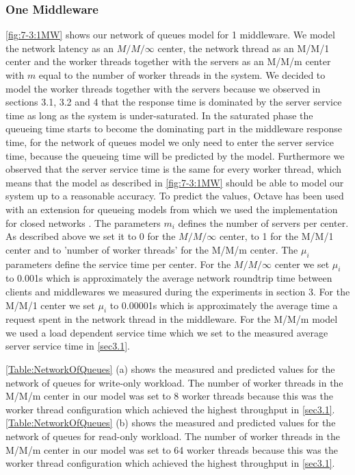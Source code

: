 \documentclass[11pt,a4paper]{article}
\begin{document}
\subsubsection{One Middleware}
\autoref{fig:7-3:1MW} shows our network of queues model for 1 middleware. We model the network latency as an $M/M/\infty$ center, the network thread as an M/M/1 center and the worker threads together with the servers as an M/M/m center with $m$ equal to the number of worker threads in the system. We decided to model the worker threads together with the servers because we observed in sections 3.1, 3.2 and 4 that the response time is dominated by the server service time as long as the system is under-saturated. In the saturated phase the queueing time starts to become the dominating part in the middleware response time, for the network of queues model we only need to enter the server service time, because the queueing time will be predicted by the model. Furthermore we observed that the server service time is the same for every worker thread, which means that the model as described in \autoref{fig:7-3:1MW} should be able to model our system up to a reasonable accuracy. To predict the values, Octave \cite{octave} has been used with an extension for queueing models from which we used the implementation for closed networks \cite[ch. 5.2.2]{queueingLib}. The parameters $m_i$ defines the number of servers per center. As described above we set it to 0 for the $M/M/\infty$ center, to 1 for the M/M/1 center and to 'number of worker threads' for the M/M/m center.
The $\mu_i$ parameters define the service time per center. For the $M/M/\infty$ center we set $\mu_i$ to 0.001s which is approximately the average network roundtrip time between clients and middlewares we measured during the experiments in section 3. For the M/M/1 center we set $\mu_i$ to 0.00001s which is approximately the average time a request spent in the network thread in the middleware.
For the M/M/m model we used a load dependent service time which we set to the measured average server service time in \autoref{sec3.1}.

\autoref{Table:NetworkOfQueues} (a) shows the measured and predicted values for the network of queues for write-only workload. The number of worker threads in the M/M/m center in our model was set to 8 worker threads because this was the worker thread configuration which achieved the highest throughput in \autoref{sec3.1}. 
\autoref{Table:NetworkOfQueues} (b) shows the measured and predicted values for the network of queues for read-only workload. The number of worker threads in the M/M/m center in our model was set to 64 worker threads because this was the worker thread configuration which achieved the highest throughput in \autoref{sec3.1}. 
\end{document}
